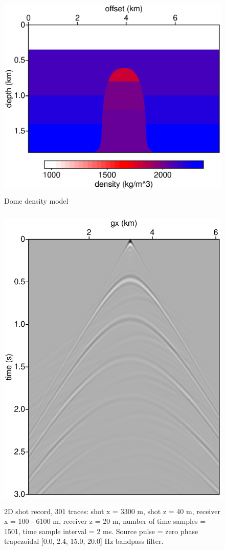 \documentclass [12pt]{georeport}
\begin{document}
\begin{figure}
\label{fig2}
\includegraphics[height=10cm,width=15cm]{./Fig/fig2.ps}
\caption{Dome density model}
\end{figure}

\begin{figure}
\label{fig3}
\includegraphics[height=15cm,width=15cm]{./Fig/fig3.ps}
\caption{2D shot record, 301 traces: shot x = 3300 m, shot z = 40 m, receiver x =
  100 - 6100 m, receiver z = 20 m, number of time samples = 1501, time
sample interval = 2 ms. Source pulse = zero phase trapezoidal [0.0,
2.4, 15.0, 20.0] Hz bandpass filter. }
\end{figure}
\end{document}
